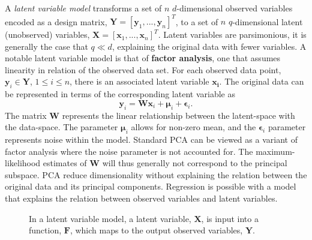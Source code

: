 \documentclass[ %
author={Dillon Keith Diep},
supervisor={Dr. Carl Henrik Ek},
degree={MEng},
title={ART-CG:},
subtitle={Assisted Real-time Content Generation of 3D Hair by Learning Manifolds},
type={Research},
year={2017} ]{dissertation}
\begin{document}
A \textit{latent variable model} transforms a set of $n$ $d$-dimensional observed variables encoded as a design matrix, $\bm{Y}=[\bm{y}_1,...,\bm{y}_n]^T$, to a set of $n$ $q$-dimensional latent (unobserved) variables, $\bm{X}=[\bm{x}_1,...,\bm{x}_n]^T$. Latent variables are parsimonious, it is generally the case that $q \ll d$, explaining the original data with fewer variables. A notable latent variable model is that of \textbf{factor analysis}, one that assumes linearity in relation of the observed data set.
For each observed data point, $\bm{y}_i \in \bm{Y}$, $1 \leq i \leq n $, there is an associated latent variable $\bm{x_i}$. The original data can be represented in terms of the corresponding latent variable as
\begin{equation} \label{ppca:fa}
\bm{y}_i=\bm{Wx}_i+\bm{\mu}_i+\bm{\epsilon}_i.
\end{equation}
The matrix $\bm{W}$ represents the linear relationship between the latent-space with the data-space.
The parameter $\bm{\mu}_i$ allows for non-zero mean, and the $\bm{\epsilon}_i$ parameter represents noise within the model. Standard PCA can be viewed as a variant of factor analysis where the noise parameter is not accounted for. The maximum-likelihood estimates of $\bm{W}$ will thus generally not correspond to the principal subspace. PCA reduce dimensionality without explaining the relation between the original data and its principal components. Regression is possible with a model that explains the relation between observed variables and latent variables.

\begin{figure}[!h]
	\centering
	\caption{In a latent variable model, a latent variable, $\bm{X}$, is input into a function, $\bm{F}$, which maps to the output observed variables, $\bm{Y}$.}
\end{figure} 
\end{document}
